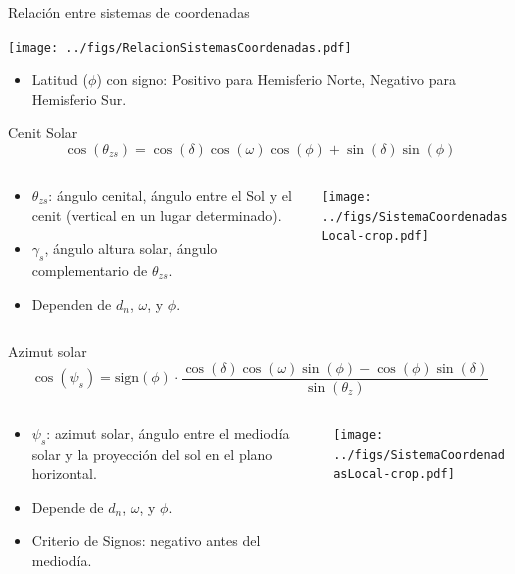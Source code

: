 \documentclass[xcolor={usenames,svgnames,dvipsnames}]{beamer}
\begin{document}
\begin{frame}[label={sec:org373e1bd}]{Relación entre sistemas de coordenadas}
\begin{center}
\texttt{[image: ../figs/RelacionSistemasCoordenadas.pdf]}
\end{center}

\begin{itemize}
\item \alert{Latitud (\(\phi\)) con signo}: Positivo para Hemisferio Norte, Negativo para Hemisferio Sur.
\end{itemize}
\end{frame}

\begin{frame}[label={sec:org4174634},plain]{Cenit Solar}
\[
\cos(\theta_{zs}) = \cos(\delta) \cos(\omega) \cos(\phi) + \sin(\delta) \sin(\phi)
\]

\begin{columns}
\begin{column}{0.55\columnwidth}
\begin{itemize}
\item \(\theta_{zs}\): \alert{ángulo cenital}, ángulo entre el Sol y el cenit (vertical en un lugar determinado).
\item \(\gamma_s\), \alert{ángulo altura solar}, ángulo complementario de \(\theta_{zs}\).
\item Dependen de \(d_n\), \(\omega\), y \(\phi\).
\end{itemize}
\end{column}
\begin{column}{0.5\columnwidth}
\begin{center}
\texttt{[image: ../figs/SistemaCoordenadasLocal-crop.pdf]}
\end{center}
\end{column}
\end{columns}
\end{frame}

\begin{frame}[label={sec:orgb094c38},plain]{Azimut solar}
\[
  \cos(\psi_{s}) = \mathrm{sign}(\phi) \cdot \frac{\cos(\delta) \cos(\omega) \sin(\phi) - \cos(\phi) \sin(\delta)} {\sin(\theta_{z})}
\]
\begin{columns}
\begin{column}{0.55\columnwidth}
\begin{itemize}
\item \(\psi_s\): \alert{azimut solar}, ángulo entre el mediodía solar y la proyección del sol en el plano horizontal.
\item Depende de \(d_n\), \(\omega\), y \(\phi\).
\item Criterio de Signos: negativo antes del mediodía.
\end{itemize}
\end{column}

\begin{column}{0.5\columnwidth}
\begin{center}
\texttt{[image: ../figs/SistemaCoordenadasLocal-crop.pdf]}
\end{center}
\end{column}
\end{columns}
\end{frame}
\end{document}

